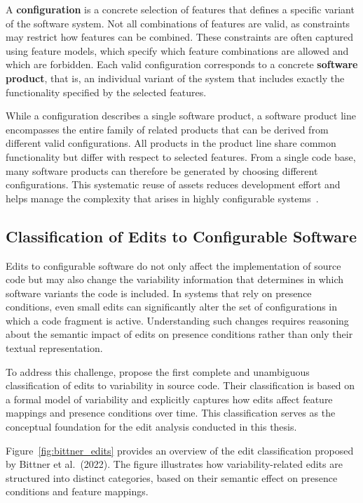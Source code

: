 A \textbf{configuration} is a concrete selection of features that defines a specific variant of the software system. Not all combinations of features are valid, as constraints may restrict how features can be combined. These constraints are often captured using feature models, which specify which feature combinations are allowed and which are forbidden. Each valid configuration corresponds to a concrete \textbf{software product}, that is, an individual variant of the system that includes exactly the functionality specified by the selected features.

While a configuration describes a single software product, a software product line encompasses the entire family of related products that can be derived from different valid configurations. All products in the product line share common functionality but differ with respect to selected features. From a single code base, many software products can therefore be generated by choosing different configurations. This systematic reuse of assets reduces development effort and helps manage the complexity that arises in highly configurable systems~\cite{apel2013_featureOrientedSoftwareProductLines}.

\subsection{Classification of Edits to Configurable Software}

Edits to configurable software do not only affect the implementation of source code but may also change the variability information that determines in which software variants the code is included. In systems that rely on presence conditions, even small edits can significantly alter the set of configurations in which a code fragment is active. Understanding such changes requires reasoning about the semantic impact of edits on presence conditions rather than only their textual representation.

To address this challenge, \textcite{Bittner2022_edits} propose the first complete and unambiguous classification of edits to variability in source code. Their classification is based on a formal model of variability and explicitly captures how edits affect feature mappings and presence conditions over time. This classification serves as the conceptual foundation for the edit analysis conducted in this thesis.

Figure~\ref{fig:bittner_edits} provides an overview of the edit classification proposed by Bittner et al.~(2022). The figure illustrates how variability-related edits are structured into distinct categories, based on their semantic effect on presence conditions and feature mappings.

